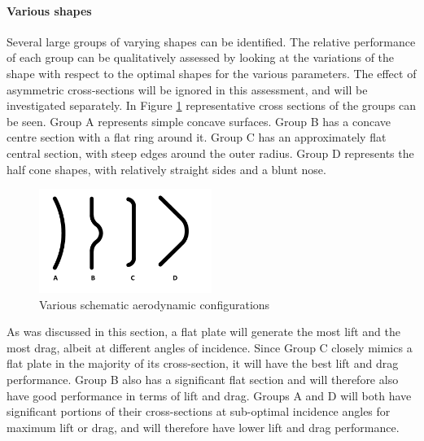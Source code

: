 \paragraph{Various shapes} \label{sec:aeroshapes}
Several large groups of varying shapes can be identified. The relative performance of each group can be qualitatively assessed by looking at the variations of the shape with respect to the optimal shapes for the various parameters. The effect of asymmetric cross-sections will be ignored in this assessment, and will be investigated separately. In Figure \ref{fig:aeroshapes} representative cross sections of the groups can be seen. Group A represents simple concave surfaces. Group B has a concave centre section with a flat ring around it. Group C has an approximately flat central section, with steep edges around the outer radius. Group D represents the half cone shapes, with relatively straight sides and a blunt nose. 

\begin{figure}[h]
	\centering
	\includegraphics[width=0.5\textwidth]{./Figure/Aerodynamics/AeroShapes.pdf}
	\caption{Various schematic aerodynamic configurations}
	\label{fig:aeroshapes}
\end{figure}

As was discussed in this section, a flat plate will generate the most lift and the most drag, albeit at different angles of incidence. Since Group C closely mimics a flat plate in the majority of its cross-section, it will have the best lift and drag performance. Group B also has a significant flat section and will therefore also have good performance in terms of lift and drag. Groups A and D will both have significant portions of their cross-sections at sub-optimal incidence angles for maximum lift or drag, and will therefore have lower lift and drag performance.

